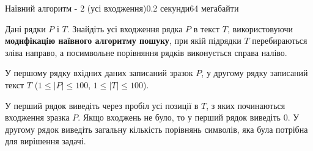 \begin{problem}{Наївний алгоритм - 2 (усі входження)}{}{}{0.2 секунди}{64 мегабайти}

Дані рядки $P$ і $T$. Знайдіть усі входження рядка $P$ в текст $T$, використовуючи {\bf модифікацію наївного алгоритму пошуку}, 
при якій підрядки $T$ перебираються зліва направо, а посимвольне порівняння рядків виконується справа наліво.

\InputFile
У першому рядку вхідних даних записаний зразок $P$, 
у другому рядку записаний текст $T$ ($1 \le |P| \le 100$, $1 \le |T| \le 100$).


\OutputFile
У перший рядок виведіть через пробіл усі позиції в $T$, з яких починаються входження зразка $P$. 
Якщо входжень не було, то у перший рядок виведіть 0.
У другому рядок виведіть загальну кількість порівнянь символів, яка була потрібна для вирішення задачі. 

\Examples

\begin{example}
%
\end{example}

\end{problem}

